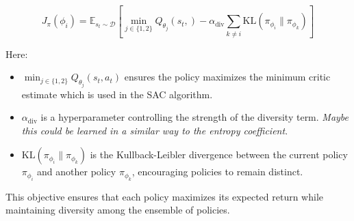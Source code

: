 \documentclass[12pt]{article}
\begin{document}
\begin{equation}
\label{eq:policy_objective}
J_{\pi}(\phi_i) = \mathbb{E}_{s_t \sim \mathcal{D}} \left[ \min_{j \in \{1, 2\}} Q_{\theta_j}(s_t, ) - \alpha_{\text{div}} \sum_{k \neq i} \text{KL}(\pi_{\phi_i} \| \pi_{\phi_k}) \right]
\end{equation}

Here:
\begin{itemize}
    \item $\min_{j \in \{1, 2\}} Q_{\theta_j}(s_t, a_t)$ ensures the policy maximizes the minimum critic estimate which is used in the SAC algorithm.
    \item $\alpha_{\text{div}}$ is a hyperparameter controlling the strength of the diversity term. \textit{Maybe this could be learned in a similar way to the entropy coefficient}.
    \item $\text{KL}(\pi_{\phi_i} \| \pi_{\phi_k})$ is the Kullback-Leibler divergence between the current policy $\pi_{\phi_i}$ and another policy $\pi_{\phi_k}$, encouraging policies to remain distinct.
\end{itemize}

This objective ensures that each policy maximizes its expected return while maintaining diversity among the ensemble of policies.
\end{document}
